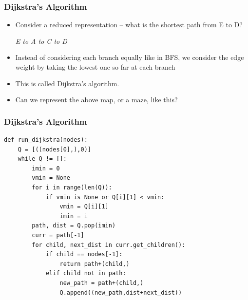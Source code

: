 \documentclass{beamer}
\begin{document}
\begin{frame}[fragile]
    \frametitle{Dijkstra's Algorithm}

\begin{itemize}
    \item 
    Consider a reduced representation -- what is the shortest path from E to D?

    \textit{E to A to C to D}

      
   \item Instead of considering each branch equally like in BFS, we consider the edge weight by taking the lowest one so far at each branch
\item  This is called Dijkstra's algorithm.

\item    Can we represent the above map, or a maze, like this?
\end{itemize}


\end{frame}



\begin{frame}[fragile]
    \frametitle{Dijkstra's Algorithm}
\begin{lstlisting}
def run_dijkstra(nodes):
    Q = [((nodes[0],),0)]
    while Q != []:
        imin = 0
        vmin = None
        for i in range(len(Q)):
            if vmin is None or Q[i][1] < vmin:
                vmin = Q[i][1]
                imin = i
        path, dist = Q.pop(imin)
        curr = path[-1]
        for child, next_dist in curr.get_children():
            if child == nodes[-1]:
                return path+(child,)
            elif child not in path:
                new_path = path+(child,)
                Q.append((new_path,dist+next_dist))
\end{lstlisting}

\end{frame}
\end{document}
